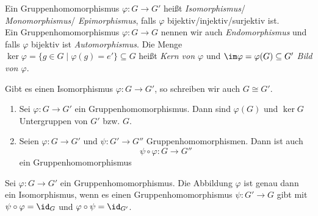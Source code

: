 \begin{defn*}      
	Ein Gruppenhomomorphismus $ \varphi: G \to G' $ heißt \emph{Isomorphismus}/ \emph{Monomorphismus}/ \emph{Epimorphismus}, falls $\varphi$ bijektiv/injektiv/surjektiv ist.\\
	Ein Gruppenhomomorphismus $\varphi: G \to G$ nennen wir auch \emph{Endomorphismus} und falls $\varphi$ bijektiv ist \emph{Automorphismus}.
	Die Menge $ \ker \varphi = \{ g \in G \mid \varphi(g) = e' \} \subseteq G $ heißt \emph{Kern von $\varphi$} und $ \im \varphi = \varphi(G) \subseteq G' $ \emph{Bild von $\varphi$}.
\end{defn*}

\begin{notat*}
	Gibt es einen Isomorphismus $\varphi: G \to G'$, so schreiben wir auch $G \cong G'$.
\end{notat*}

\begin{rem*}
	\begin{enumerate}[label=\textcircled{\alph*}]
		\item Sei $ \varphi: G \to G' $ ein Gruppenhomomorphismus. Dann sind $\varphi(G)$ und $\ker G$ Untergruppen von $G'$ bzw. $G$.
		\item Seien $ \varphi: G \to G' $ und $ \psi: G' \to G'' $ Gruppenhomomorphismen. Dann ist auch
			\[ \psi \circ \varphi: G \to G'' \]
			ein Gruppenhomomorphismus
	\end{enumerate}
\end{rem*}

\begin{lem}
	Sei $ \varphi: G \to G' $ ein Gruppenhomomorphismus. Die Abbildung $ \varphi $ ist genau dann ein Isomorphismus, wenn es einen Gruppenhomomorphismus $ \psi: G' \to G $ gibt mit $ \psi \circ \varphi = \id_G $ und $ \varphi \circ \psi = \id_{G'} $.
\end{lem}

